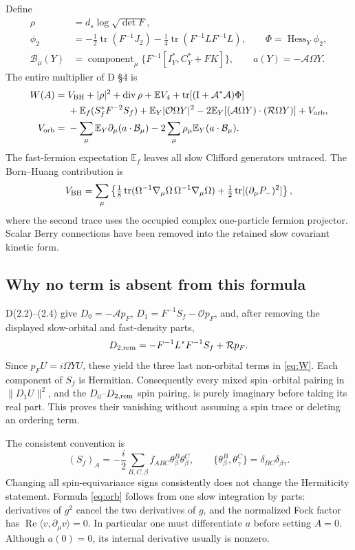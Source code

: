 \documentclass[11pt,letterpaper]{article}
\newcommand{\tr}{\operatorname{tr}}
\newcommand{\E}{\mathbb E}
\newcommand{\ip}[2]{\langle#1,#2\rangle}
\newcommand{\calA}{\mathcal A}
\newcommand{\calO}{\mathcal O}
\newcommand{\calR}{\mathcal R}
\newcommand{\calB}{\mathcal B}
\newcommand{\Id}{\mathrm I}
\begin{document}
Define
\begin{align}
 \rho&=d_s\log\sqrt{\det F},\\
 \phi_2&=-\tfrac12\tr(F^{-1}J_2)-\tfrac14\tr(F^{-1}LF^{-1}L),
 \qquad \Phi=\operatorname{Hess}_Y\phi_2,\\
 \calB_\mu(Y)&=\operatorname{component}_\mu
       \{F^{-1}[I_Y^*,C_Y^*+FK]\},\qquad a(Y)=-\calA\Omega Y.
\end{align}
The entire multiplier of D \S4 is
\begin{align}
 W(A)={}&V_{\rm BH}+|\rho|^2+\operatorname{div}\rho+\E V_4
       +\tr[(\Id+\calA^*\calA)\Phi] \nonumber\\
 &+\E_f(S_f^*F^{-2}S_f)
       +\E_Y|\calO\Omega Y|^2
       -2\E_Y[(\calA\Omega Y)\cdot(\calR\Omega Y)]
       +V_{\rm orb}, \label{eq:W}\\
 V_{\rm orb}={}&-\sum_\mu\E_Y\partial_\mu(a\cdot\calB_\mu)
              -2\sum_\mu\rho_\mu\E_Y(a\cdot\calB_\mu). \label{eq:orb}
\end{align}
The fast-fermion expectation $\E_f$ leaves all slow Clifford generators untraced. The Born--Huang contribution is
\begin{equation}
 V_{\rm BH}=\sum_\mu\left\{
 \tfrac18\tr(\Omega^{-1}\nabla_\mu\Omega\,
                  \Omega^{-1}\nabla_\mu\Omega)
 +\tfrac12\tr[(\partial_\mu P_-)^2]\right\}, \label{eq:BH}
\end{equation}
where the second trace uses the occupied complex one-particle fermion projector. Scalar Berry connections have been removed into the retained slow covariant kinetic form.

\subsection{Why no term is absent from this formula}
D(2.2)--(2.4) give $D_0=-\calA p_F$, $D_1=F^{-1}S_f-\calO p_F$, and, after removing the displayed slow-orbital and fast-density parts,
\[
 D_{2,\rm rem}=-F^{-1}L^*F^{-1}S_f+\calR p_F.
\]
Since $p_FU=i\Omega YU$, these yield the three last non-orbital terms in \eqref{eq:W}. Each component of $S_f$ is Hermitian. Consequently every mixed spin--orbital pairing in $\|D_1U\|^2$, and the $D_0$--$D_{2,\rm rem}$ spin pairing, is purely imaginary before taking its real part. This proves their vanishing without assuming a spin trace or deleting an ordering term.

The consistent convention is
\[
 (S_f)_A=-\frac{i}{2}\sum_{B,C,\beta}f_{ABC}\theta^B_\beta\theta^C_\beta,
 \qquad\{\theta^B_\beta,\theta^C_\gamma\}=\delta_{BC}\delta_{\beta\gamma}.
\]
Changing all spin-equivariance signs consistently does not change the Hermiticity statement. Formula \eqref{eq:orb} follows from one slow integration by parts: derivatives of $g^2$ cancel the two derivatives of $g$, and the normalized Fock factor has $\operatorname{Re}\ip v{\partial_\mu v}=0$. In particular one must differentiate $a$ before setting $A=0$. Although $a(0)=0$, its internal derivative usually is nonzero.
\end{document}
